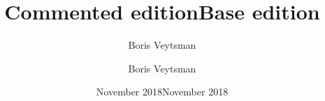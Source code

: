 \documentclass{book}
\title{Commented edition}
\author{Boris Veytsman}
\date{November 2018}
\begin{document}
\frontmatter
\title{Base edition}
\author{Boris Veytsman}
\date{November 2018}

\kant

\mainmatter
\begin{commeditComments}
  \kant[6]
\end{commeditComments}

\kant[6]

\begin{commeditText}
  \kant[11]
\end{commeditText}

\begin{commeditComments}
  \kant[2]
\end{commeditComments}

\kant[12]
\end{document}
